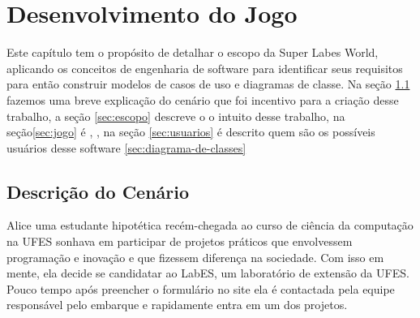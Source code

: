 \chapter{Desenvolvimento do Jogo}
\label{sec-contribuicao}



Este capítulo tem o propósito de detalhar o escopo da Super Labes World, aplicando os conceitos de engenharia de software para identificar seus requisitos para então construir modelos de casos de uso e diagramas de classe. Na seção \ref{sec:descricao-do-cenario} fazemos uma breve explicação do cenário que foi incentivo para a criação desse trabalho, a seção \ref{sec:escopo} descreve o o intuito desse trabalho, na seção\ref{sec:jogo} é ,  , na seção \ref{sec:usuarios} é descrito quem são os possíveis usuários desse software \ref{sec:diagrama-de-classes}
\section{Descrição do Cenário}
\label{sec:descricao-do-cenario}
Alice uma estudante hipotética recém-chegada ao curso de ciência da computação na UFES sonhava em participar de projetos práticos que envolvessem programação e inovação e que fizessem diferença na sociedade. Com isso em mente, ela decide se candidatar ao LabES, um laboratório de extensão da UFES. Pouco tempo após preencher o formulário no site ela é contactada pela equipe responsável pelo embarque e rapidamente entra em um dos projetos.

